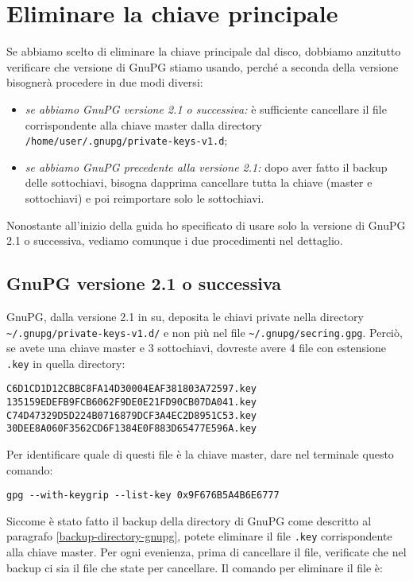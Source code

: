 \section{Eliminare la chiave principale}

Se abbiamo scelto di eliminare la chiave principale dal disco, dobbiamo
anzitutto verificare che versione di GnuPG stiamo usando, perché a seconda della
versione bisognerà procedere in due modi diversi:

\begin{itemize}
   \item \emph{se abbiamo GnuPG versione 2.1 o successiva:} è sufficiente
   cancellare il file corrispondente alla chiave master dalla directory
   \texttt{/home/user/.gnupg/private-keys-v1.d};
   \item \emph{se abbiamo GnuPG precedente alla versione 2.1:} dopo aver fatto
   il backup delle sottochiavi, bisogna dapprima cancellare tutta la chiave
   (master e sottochiavi) e poi reimportare solo le sottochiavi.
\end{itemize}

Nonostante all'inizio della guida ho specificato di usare solo la versione di
GnuPG 2.1 o successiva, vediamo comunque i due procedimenti nel dettaglio.

\subsection{GnuPG versione 2.1 o successiva}

GnuPG, dalla versione 2.1 in su, deposita le chiavi private nella directory
\texttt{\~{}/.gnupg/private-keys-v1.d/} e non più nel file
\texttt{\~{}/.gnupg/secring.gpg}. Perciò, se avete una chiave master e 3
sottochiavi, dovreste avere 4 file con estensione \texttt{.key} in quella
directory:

\begin{lstlisting}
C6D1CD1D12CBBC8FA14D30004EAF381803A72597.key
135159EDEFB9FCB6062F9DE0E21FD90CB07DA041.key
C74D47329D5D224B0716879DCF3A4EC2D8951C53.key
30DEE8A060F3562CD6F1384E0F883D65477E596A.key
\end{lstlisting}

Per identificare quale di questi file è la chiave master, dare nel terminale
questo comando:

\begin{lstlisting}
gpg --with-keygrip --list-key 0x9F676B5A4B6E6777
\end{lstlisting}

Siccome è stato fatto il backup della directory di GnuPG come descritto al
paragrafo \vref{backup-directory-gnupg}, potete eliminare il file \texttt{.key}
corrispondente alla chiave master. Per ogni evenienza, prima di cancellare il
file, verificate che nel backup ci sia il file che state per cancellare. Il
comando per eliminare il file è:

